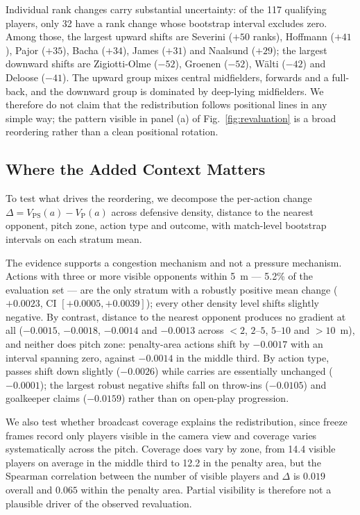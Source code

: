 \documentclass[runningheads]{llncs}
\begin{document}
Individual rank changes carry substantial uncertainty: of the 117 qualifying players, only 32 have a rank change whose bootstrap interval excludes zero. Among those, the largest upward shifts are Severini ($+50$ ranks), Hoffmann ($+41$), Pajor ($+35$), Bacha ($+34$), James ($+31$) and Naalsund ($+29$); the largest downward shifts are Zigiotti-Olme ($-52$), Groenen ($-52$), W\"alti ($-42$) and Deloose ($-41$). The upward group mixes central midfielders, forwards and a full-back, and the downward group is dominated by deep-lying midfielders. We therefore do not claim that the redistribution follows positional lines in any simple way; the pattern visible in panel (a) of Fig.~\ref{fig:revaluation} is a broad reordering rather than a clean positional rotation.

\subsection{Where the Added Context Matters}
\label{sec:strata}
To test what drives the reordering, we decompose the per-action change $\Delta = V_{\mathrm{PS}}(a) - V_{\mathrm{P}}(a)$ across defensive density, distance to the nearest opponent, pitch zone, action type and outcome, with match-level bootstrap intervals on each stratum mean.

The evidence supports a congestion mechanism and not a pressure mechanism. Actions with three or more visible opponents within 5~m --- 5.2\% of the evaluation set --- are the only stratum with a robustly positive mean change ($+0.0023$, CI $[+0.0005, +0.0039]$); every other density level shifts slightly negative. By contrast, distance to the nearest opponent produces no gradient at all ($-0.0015$, $-0.0018$, $-0.0014$ and $-0.0013$ across $<2$, $2$--$5$, $5$--$10$ and $>10$~m), and neither does pitch zone: penalty-area actions shift by $-0.0017$ with an interval spanning zero, against $-0.0014$ in the middle third. By action type, passes shift down slightly ($-0.0026$) while carries are essentially unchanged ($-0.0001$); the largest robust negative shifts fall on throw-ins ($-0.0105$) and goalkeeper claims ($-0.0159$) rather than on open-play progression.

We also test whether broadcast coverage explains the redistribution, since freeze frames record only players visible in the camera view and coverage varies systematically across the pitch. Coverage does vary by zone, from 14.4 visible players on average in the middle third to 12.2 in the penalty area, but the Spearman correlation between the number of visible players and $\Delta$ is $0.019$ overall and $0.065$ within the penalty area. Partial visibility is therefore not a plausible driver of the observed revaluation.
\end{document}
